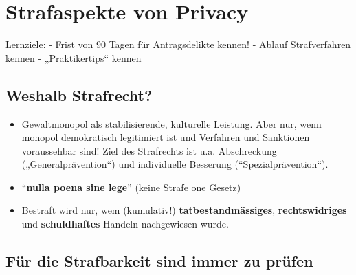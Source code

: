 \hypertarget{strafaspekte-von-privacy}{%
\section{Strafaspekte von Privacy}\label{strafaspekte-von-privacy}}

Lernziele: - Frist von 90 Tagen für Antragsdelikte kennen! - Ablauf
Strafverfahren kennen - „Praktikertips`` kennen

\hypertarget{weshalb-strafrecht}{%
\subsection{Weshalb Strafrecht?}\label{weshalb-strafrecht}}

\begin{itemize}
\tightlist
\item
  Gewaltmonopol als stabilisierende, kulturelle Leistung. Aber nur, wenn
  monopol demokratisch legitimiert ist und Verfahren und Sanktionen
  voraussehbar sind! Ziel des Strafrechts ist u.a. Abschreckung
  („Generalprävention``) und individuelle Besserung
  (``Spezialprävention``).
\item
  ``\textbf{nulla poena sine lege}'' (keine Strafe one Gesetz)
\item
  Bestraft wird nur, wem (kumulativ!) \textbf{tatbestandmässiges},
  \textbf{rechtswidriges} und \textbf{schuldhaftes} Handeln nachgewiesen
  wurde.
\end{itemize}

\hypertarget{fuxfcr-die-strafbarkeit-sind-immer-zu-pruxfcfen}{%
\subsection{Für die Strafbarkeit sind immer zu
prüfen}\label{fuxfcr-die-strafbarkeit-sind-immer-zu-pruxfcfen}}


